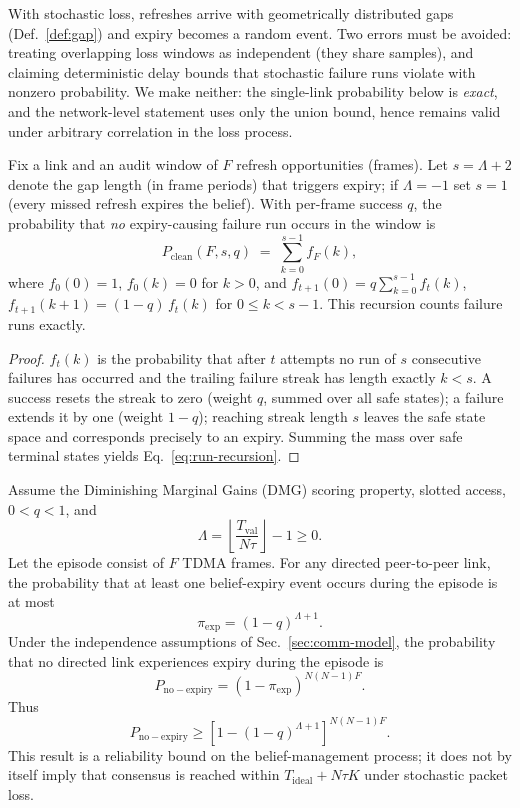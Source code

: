 With stochastic loss, refreshes arrive with geometrically distributed gaps (Def.~\ref{def:gap}) and expiry becomes a random event. Two errors must be avoided: treating overlapping loss windows as independent (they share samples), and claiming deterministic delay bounds that stochastic failure runs violate with nonzero probability. We make neither: the single-link probability below is \emph{exact}, and the network-level statement uses only the union bound, hence remains valid under arbitrary correlation in the loss process.

\begin{lemma}\label{lem:run}
Fix a link and an audit window of $F$ refresh opportunities (frames). Let $s = \Lambda + 2$ denote the gap length (in frame periods) that triggers expiry; if $\Lambda = -1$ set $s = 1$ (every missed refresh expires the belief). With per-frame success $q$, the probability that \emph{no} expiry-causing failure run occurs in the window is
\begin{equation}
    P_{\mathrm{clean}}(F, s, q) \;=\; \sum_{k=0}^{s-1} f_F(k),
    \label{eq:run-recursion}
\end{equation}
where $f_0(0) = 1$, $f_0(k) = 0$ for $k > 0$, and
$f_{t+1}(0) = q \sum_{k=0}^{s-1} f_t(k)$,
$f_{t+1}(k{+}1) = (1-q)\, f_t(k)$ for $0 \leq k < s{-}1$.
This recursion counts failure runs exactly.
\end{lemma}

\begin{proof}
$f_t(k)$ is the probability that after $t$ attempts no run of $s$ consecutive failures has occurred and the trailing failure streak has length exactly $k < s$. A success resets the streak to zero (weight $q$, summed over all safe states); a failure extends it by one (weight $1-q$); reaching streak length $s$ leaves the safe state space and corresponds precisely to an expiry. Summing the mass over safe terminal states yields Eq.~\eqref{eq:run-recursion}.
\end{proof}

\begin{theorem}\label{thm:probabilistic}
Assume the Diminishing Marginal Gains (DMG) scoring property, slotted access, $0<q<1$, and
\[
\Lambda =
\left\lfloor \frac{T_{\mathrm{val}}}{N\tau}\right\rfloor-1
\geq 0.
\]
Let the episode consist of $F$ TDMA frames. For any directed
peer-to-peer link, the probability that at least one belief-expiry
event occurs during the episode is at most
\[
\pi_{\mathrm{exp}} =
(1-q)^{\Lambda+1}.
\]
Under the independence assumptions of Sec.~\ref{sec:comm-model},
the probability that no directed link experiences expiry during the
episode is
\[
P_{\mathrm{no-expiry}}
=
\left(1-\pi_{\mathrm{exp}}\right)^{N(N-1)F}.
\]
Thus
\[
P_{\mathrm{no-expiry}}
\geq
\left[
1-(1-q)^{\Lambda+1}
\right]^{N(N-1)F}.
\]
This result is a reliability bound on the belief-management process;
it does not by itself imply that consensus is reached within
$T_{\mathrm{ideal}}+N\tau K$ under stochastic packet loss.
\end{theorem}

